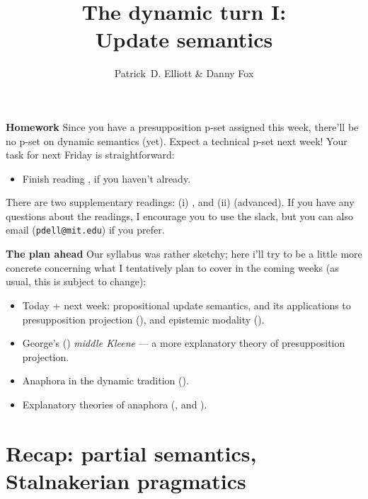 \documentclass[nols,twoside,nofonts,nobib,nohyper]{tufte-handout}
\title{The dynamic turn I:\\
Update semantics}
\author[Patrick D. Elliott \& Danny Fox]{Patrick~D. Elliott \& Danny Fox}
\theoremstyle{definition}
\begin{document}
\maketitle%

\begin{tcolorbox}
\textbf{Homework}
\tcblower
Since you have a presupposition p-set assigned this week, there'll be no p-set on dynamic semantics (yet). Expect a technical p-set next week! Your task for next Friday is straightforward:
\begin{itemize}
    \item Finish reading \citet{Yalcin2013}, if you haven't already.
\end{itemize}
There are two supplementary readings: (i) \cite{Heim1983}, and (ii) \cite{Veltman1996} (advanced). If you have any questions about the readings, I encourage you to use the slack, but you can also email (\texttt{pdell@mit.edu}) if you prefer.
\end{tcolorbox}

\begin{tcolorbox}
  \textbf{The plan ahead}
  \tcblower
  Our syllabus was rather sketchy; here i'll try to be a little more concrete concerning what I tentatively plan to cover in the coming weeks (as usual, this is subject to change):
  \begin{itemize}
      \item Today + next week: propositional update semantics, and its applications to presupposition projection (\citealt{Heim1983}), and epistemic modality (\citealt{Veltman1996,GroenendijkEtAl1996}).
      \item George's (\citeyear{George2007,George2008,George2014}) \textit{middle Kleene} --- a more explanatory theory of presupposition projection.
      \item Anaphora in the dynamic tradition (\citealt{Heim1982,GroenendijkStokhof1991,Dekker1994}).
      \item Explanatory theories of anaphora (\citealt{Rothschild2017}, \citealt{Elliott2020b,Elliott2020d} and \citealt{Mandelkern2020a,Mandelkern2020b}).
  \end{itemize}
\end{tcolorbox}

\section{Recap: partial semantics, Stalnakerian pragmatics}
\end{document}
